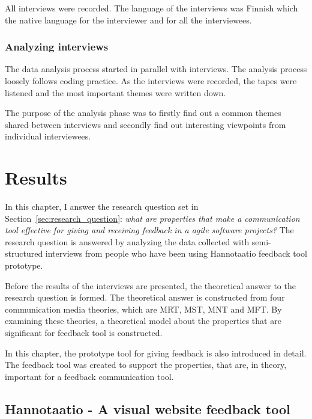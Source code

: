 \documentclass[english,12pt,a4paper,pdftex]{article}
\begin{document}
All interviews were recorded. The language of the interviews was Finnish which the native language for the interviewer and for all the interviewees.

\subsubsection{Analyzing interviews}

The data analysis process started in parallel with interviews. The analysis process loosely follows coding practice. As the interviews were recorded, the tapes were listened and the most important themes were written down. 

The purpose of the analysis phase was to firstly find out a common themes shared between interviews and secondly find out interesting viewpoints from individual interviewees.

\clearpage

\section{Results}
\acresetall

In this chapter, I answer the research question set in Section~\ref{sec:research_question}: \textit{what are properties that make a communication tool effective for giving and receiving feedback in a agile software projects?} The research question is answered by analyzing the data collected with semi-structured interviews from people who have been using Hannotaatio feedback tool prototype.

Before the results of the interviews are presented, the theoretical answer to the research question is formed. The theoretical answer is constructed from four communication media theories, which are \ac{MRT}, \ac{MST}, \ac{MNT} and \ac{MFT}. By examining these theories, a theoretical model about the properties that are significant for feedback tool is constructed.

In this chapter, the prototype tool for giving feedback is also introduced in detail. The feedback tool was created to support the properties, that are, in theory, important for a feedback communication tool.

\subsection{Hannotaatio - A visual website feedback tool}

\end{document}
